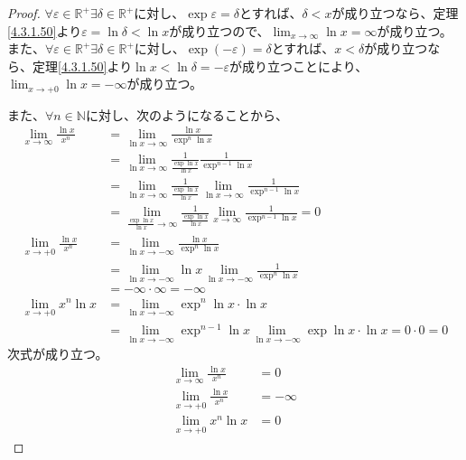 \documentclass[dvipdfmx]{jsarticle}
\begin{document}
\begin{proof}
$\forall\varepsilon \in \mathbb{R}^{+}\exists\delta \in \mathbb{R}^{+}$に対し、$\exp\varepsilon = \delta$とすれば、$\delta < x$が成り立つなら、定理\ref{4.3.1.50}より$\varepsilon = \ln\delta < \ln x$が成り立つので、$\lim_{x \rightarrow \infty}{\ln x} = \infty$が成り立つ。また、$\forall\varepsilon \in \mathbb{R}^{+}\exists\delta \in \mathbb{R}^{+}$に対し、$\exp( - \varepsilon) = \delta$とすれば、$x < \delta$が成り立つなら、定理\ref{4.3.1.50}より$\ln x < \ln\delta = - \varepsilon$が成り立つことにより、$\lim_{x \rightarrow + 0}{\ln x} = - \infty$が成り立つ。\par
また、$\forall n \in \mathbb{N}$に対し、次のようになることから、
\begin{align*}
\lim_{x \rightarrow \infty}\frac{\ln x}{x^{n}} &= \lim_{\ln x \rightarrow \infty}\frac{\ln x}{\exp^{n}{\ln x}}\\
&= \lim_{\ln x \rightarrow \infty}{\frac{1}{\frac{\exp{\ln x}}{\ln x}}\frac{1}{\exp^{n - 1}{\ln x}}}\\
&= \lim_{\ln x \rightarrow \infty}\frac{1}{\frac{\exp{\ln x}}{\ln x}}\lim_{\ln x \rightarrow \infty}\frac{1}{\exp^{n - 1}{\ln x}}\\
&= \lim_{\frac{\exp{\ln x}}{\ln x} \rightarrow \infty}\frac{1}{\frac{\exp{\ln x}}{\ln x}}\lim_{x \rightarrow \infty}\frac{1}{\exp^{n - 1}{\ln x}} = 0\\
\lim_{x \rightarrow + 0}\frac{\ln x}{x^{n}} &= \lim_{\ln x \rightarrow - \infty}\frac{\ln x}{\exp^{n}{\ln x}}\\
&= \lim_{\ln x \rightarrow - \infty}{\ln x}\lim_{\ln x \rightarrow - \infty}\frac{1}{\exp^{n}{\ln x}}\\
&= - \infty \cdot \infty = - \infty\\
\lim_{x \rightarrow + 0}{x^{n}\ln x} &= \lim_{\ln x \rightarrow - \infty}{\exp^{n}{\ln x} \cdot \ln x}\\
&= \lim_{\ln x \rightarrow - \infty}{\exp^{n - 1}{\ln x}}\lim_{\ln x \rightarrow - \infty}{\exp{\ln x} \cdot \ln x} = 0 \cdot 0 = 0
\end{align*}
次式が成り立つ。
\begin{align*}
\lim_{x \rightarrow \infty}\frac{\ln x}{x^{n}} &= 0\\
\lim_{x \rightarrow + 0}\frac{\ln x}{x^{n}} &= - \infty\\
\lim_{x \rightarrow + 0}{x^{n}\ln x} &= 0
\end{align*}
\end{proof}
\end{document}
